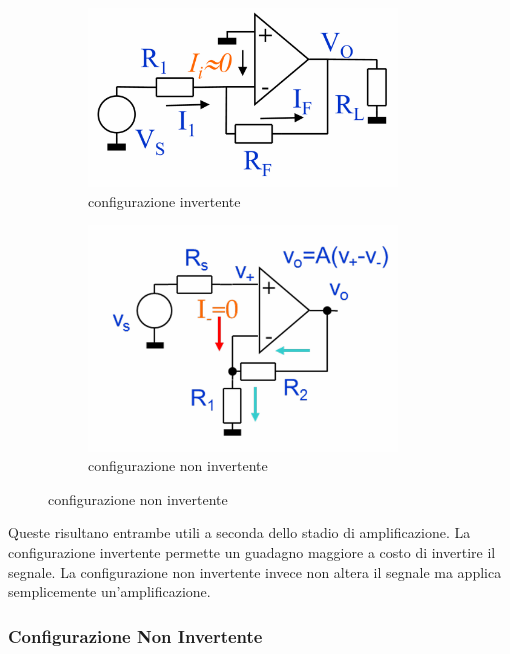 \begin{figure}[!h]
    \centering
    \begin{subfigure}[b]{0.45\textwidth}
        \includegraphics[width=0.9\textwidth]{assets/scheda analogica/invertente.png}
        \caption{configurazione invertente}
    \end{subfigure}%
    \begin{subfigure}[b]{0.45\textwidth}
        \includegraphics[width=0.9\textwidth]{assets/scheda analogica/non_invertente.png}
        \caption{configurazione non invertente}
    \end{subfigure}
\end{figure}

Queste risultano entrambe utili a seconda dello stadio di amplificazione. La configurazione invertente permette un guadagno maggiore a costo di invertire il segnale.
La configurazione non invertente invece non altera il segnale ma applica semplicemente un'amplificazione.

\subsubsection{Configurazione Non Invertente}


